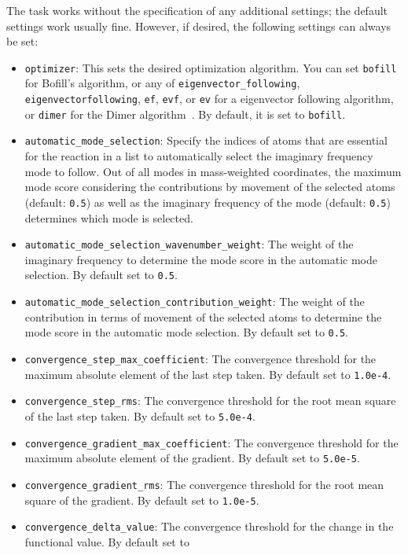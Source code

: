 \documentclass[]{tufte-book}
\begin{document}
The task works without the specification of any additional settings; the default settings work usually fine. However,
if desired, the following settings can always be set:
\begin{itemize}
\item \texttt{optimizer}: This sets the desired optimization algorithm. You can set \texttt{bofill} for Bofill's algorithm\cite{bofill1, bofill2},
or any of \texttt{eigenvector\_following}, \texttt{eigenvectorfollowing}, \texttt{ef}, \texttt{evf}, or \texttt{ev} for a
eigenvector following algorithm, or \texttt{dimer} for the Dimer algorithm~\cite{dimer1,dimer2,dimer3}. By default, it is set to \texttt{bofill}.
\item \texttt{automatic\_mode\_selection}: Specify the indices of atoms that are essential for the reaction in a list to automatically
 select the imaginary frequency mode to follow. Out of all modes in mass-weighted coordinates, the maximum mode score considering the contributions by movement of the selected atoms (default: \texttt{0.5}) as well as the imaginary frequency of the mode (default: \texttt{0.5}) determines which mode is selected.
\item \texttt{automatic\_mode\_selection\_wavenumber\_weight}: The weight of the imaginary frequency to determine the mode score in the automatic mode selection. By default set to \texttt{0.5}.
\item \texttt{automatic\_mode\_selection\_contribution\_weight}: The weight of the contribution in terms of movement of the selected atoms to determine the mode score in the automatic mode selection. By default set to \texttt{0.5}.
\item \texttt{convergence\_step\_max\_coefficient}: The convergence threshold for the maximum absolute element of the last step taken.
By default set to \texttt{1.0e-4}.
\item \texttt{convergence\_step\_rms}: The convergence threshold for the root mean square of the last step taken. By default set to
\texttt{5.0e-4}.
\item \texttt{convergence\_gradient\_max\_coefficient}: The convergence threshold for the maximum absolute element of the gradient.
By default set to \texttt{5.0e-5}.
\item \texttt{convergence\_gradient\_rms}: The convergence threshold for the root mean square of the gradient. By default set to
\texttt{1.0e-5}.
\item \texttt{convergence\_delta\_value}: The convergence threshold for the change in the functional value. By default set to

\end{itemize}
\end{document}
